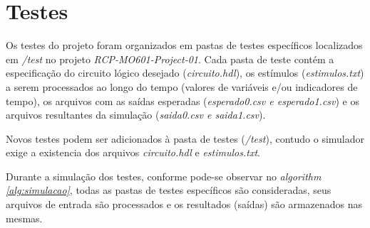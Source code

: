 
\section{Testes}

Os testes do projeto foram organizados em pastas de testes específicos localizados em \textit{/test} 
no projeto \textit{RCP-MO601-Project-01}. Cada pasta de teste contém a especificação do circuito 
lógico desejado (\textit{circuito.hdl}), os estímulos (\textit{estimulos.txt}) a serem processados ao 
longo do tempo (valores de variáveis e/ou indicadores de tempo), 
os arquivos com as saídas esperadas (\textit{esperado0.csv e esperado1.csv}) e os arquivos resultantes da simulação 
(\textit{saida0.csv e saida1.csv}).

Novos testes podem ser adicionados à pasta de testes (\textit{/test}), contudo o simulador exige a
existencia dos arquivos \textit{circuito.hdl} e \textit{estimulos.txt}.

Durante a simulação dos testes, conforme pode-se observar no \textit{algorithm \ref{alg:simulacao}}, 
todas as pastas de testes específicos são consideradas, seus arquivos de entrada são 
processados e os resultados (saídas) são armazenados nas mesmas.